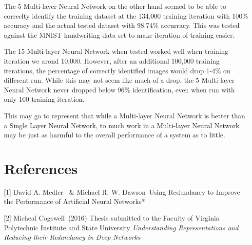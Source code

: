 \documentclass{article}
\begin{document}
The 5 Multi-layer Neural Network on the other hand seemed to be able to correclty identify the training dataset at the 134,000 training iteration with 100\% accuracy and the actual tested dataset with 98.74\% accurracy. This was tested against the MNIST handwriting data set to make iteration of training easier.

The 15 Multi-layer Neural Network when tested worked well when training iteration we arond 10,000. However, after an additional 100,000 training  iterations, the percentage of correctly identified images would drop 1-4\% on different run. While this may not seem like much of a drop, the 5 Multi-layer Neural Network never dropped below 96\% identification, even when run with only 100 training iteration.

This may go to represent that while a Multi-layer Neural Network is better than a Single Layer Neural Network, to much work in a Multi-layer Neural Network may be just as harmful to the overall performance of a system as to little.



\section*{References}

\small

[1] David A. Medler \ \& Michael R. W. Dawson\ Using Redundancy to 
Improve the Performance of Artificial Neural Networks*

[2] Micheal Cogswell\ (2016) Thesis submitted to the Faculty of
Virginia Polytechnic Institute and State University {\it  Understanding 
Representations and Reducing their Redundancy in Deep Networks}  

\end{document}
